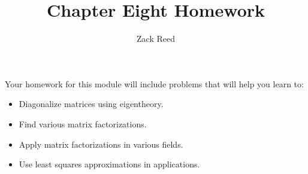 \documentclass{ximera}
\author{Zack Reed}
\title{Chapter Eight Homework}
\begin{document}
 
\begin{abstract}
\end{abstract}
 
\maketitle
 
Your homework for this module will include problems that will help you learn to:
 
\begin{itemize}
\item Diagonalize matrices using eigentheory.
\item Find various matrix factorizations.
\item Apply matrix factorizations in various fields.
\item Use least squares approximations in applications.
\end{itemize}
 
 
\end{document}
